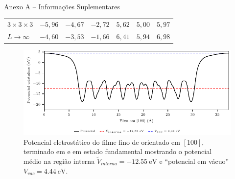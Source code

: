 \begin{frame}[allowframebreaks]{Anexo A -- Informações Suplementares}
\begin{minipage}{\textwidth}
\begin{table}[h!]
{\begin{tabular}{lrrrrrr}
            $3\!\times\!3\!\times\!3$ & $-5,\!96$                                  & $-4,\!67$                                               & $-2,\!72$                                                & $5,\!62$                                   & $5,\!00$                                                & $5,\!97$                                                 \\
            $L\to\infty$              & $-4,\!60$                                  & $-3,\!53$                                               & $-1,\!66$                                                & $6,\!41$                                   & $5,\!94$                                                & $6,\!98$                                                 \\\hline
            \end{tabular}}
        \end{table}
    \end{minipage}\framebreak
    \begin{figure}[h]
        \centering
        \caption{Potencial eletrostático do filme fino de  orientado em $[100]$, terminado em  e em estado fundamental mostrando o potencial médio na região interna $\tilde{V}_{interna} = \SI{-12.55}{\electronvolt}$ e ``potencial em vácuo'' $V_{vac} = \SI{4.44}{\electronvolt}$.}
        \includegraphics{../floats/vacuum_tf/x_potential.pdf}
    \end{figure}
\end{frame}